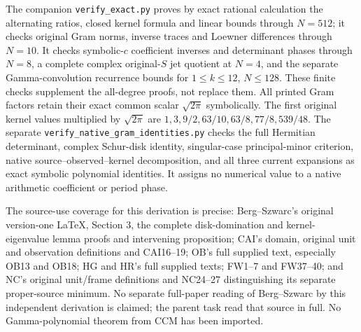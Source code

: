 \documentclass[11pt]{article}
\begin{document}
The companion \texttt{verify\_exact.py} proves by exact rational
calculation the alternating ratios, closed kernel formula and linear
bounds through $N=512$; it checks original Gram norms, inverse traces
and Loewner differences through $N=10$.  It checks symbolic-$c$
coefficient inverses and determinant phases through $N=8$, a complete
complex original-$S$ jet quotient at $N=4$, and the separate
Gamma-convolution recurrence bounds for $1\le k\le12$, $N\le128$.
These finite checks supplement the all-degree proofs, not replace them.
All printed Gram factors retain their exact common scalar
$\sqrt{2\pi}$ symbolically.  The first original kernel values multiplied
by $\sqrt{2\pi}$ are $1,3,9/2,63/10,63/8,77/8,539/48$.
The separate \texttt{verify\_native\_gram\_identities.py} checks the full
Hermitian determinant, complex Schur-disk identity, singular-case
principal-minor criterion, native source--observed--kernel decomposition,
and all three current expansions as exact symbolic polynomial identities.
It assigns no numerical value to a native arithmetic coefficient or
period phase.

The source-use coverage for this derivation is precise: Berg--Szwarc's
original version-one \LaTeX, Section 3, the complete disk-domination
and kernel-eigenvalue lemma proofs and intervening proposition; CAI's
domain, original unit and observation definitions and CAI16--19;
OB's full supplied text, especially OB13 and OB18; HG and HR's full
supplied texts; FW1--7 and FW37--40; and NC's original unit/frame
definitions and NC24--27 distinguishing its separate proper-source
minimum.  No separate full-paper reading of Berg--Szwarc by this
independent derivation is claimed; the parent task read that source in
full.  No Gamma-polynomial theorem from CCM has been imported.
\end{document}
